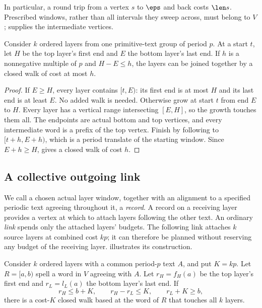 In particular, a round trip from a vertex $s$ to $\eps$ and back costs $\len s$. Prescribed windows, rather than all intervals they sweep across, must belong to $V$;  supplies the intermediate vertices.

\begin{lemma}\label{lem:band}
Consider $k$ ordered layers from one primitive-text group of period $p$. At a start $t$, let $H$ be the top layer's first end and $E$ the bottom layer's last end. If $h$ is a nonnegative multiple of $p$ and $H-E\le h$, the layers can be joined together by a closed walk of cost at most $h$.
\end{lemma}

\begin{proof}
If $E\ge H$, every layer contains $[t,E)$: its first end is at most $H$ and its last end is at least $E$. No added walk is needed. Otherwise grow at start $t$ from end $E$ to $H$. Every layer has a vertical range intersecting $[E,H]$, so the growth touches them all. The endpoints are actual bottom and top vertices, and every intermediate word is a prefix of the top vertex. Finish by following to $[t+h,E+h)$, which is a period translate of the starting window. Since $E+h\ge H$,  gives a closed walk of cost $h$.
\end{proof}

\subsection{A collective outgoing link}

We call a chosen actual layer window, together with an alignment to a specified periodic text agreeing throughout it, a \emph{record}. A record on a receiving layer provides a vertex at which to attach layers following the other text. An ordinary \emph{link} spends only the attached layers' budgets. The following link attaches $k$ source layers at combined cost $kp$; it can therefore be planned without reserving any budget of the receiving layer.  illustrates its construction.

\begin{lemma}\label{lem:collective}
Consider $k$ ordered layers with a common period-$p$ text $A$, and put $K=kp$. Let $R=[a,b)$ spell a word in $V$ agreeing with $A$. Let $r_H=f_H(a)$ be the top layer's first end and $r_L=l_L(a)$ the bottom layer's last end. If
\begin{equation}\label{eq:collective-conditions}
r_H\le b+K,\qquad r_H-r_L\le K,
\qquad r_L+K\ge b,
\end{equation}
there is a cost-$K$ closed walk based at the word of $R$ that touches all $k$ layers.
\end{lemma}

